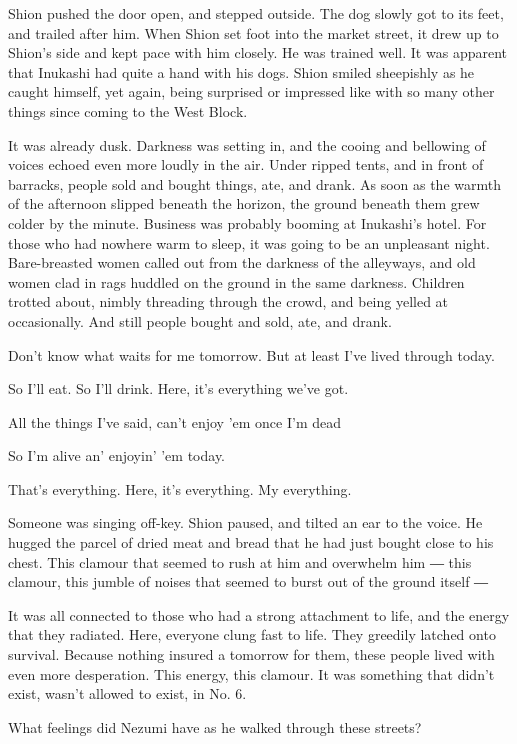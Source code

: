 Shion pushed the door open, and stepped outside. The dog slowly got to
its feet, and trailed after him. When Shion set foot into the market
street, it drew up to Shion's side and kept pace with him closely. He
was trained well. It was apparent that Inukashi had quite a hand with
his dogs. Shion smiled sheepishly as he caught himself, yet again, being
surprised or impressed like with so many other things since coming to
the West Block.

It was already dusk. Darkness was setting in, and the cooing and
bellowing of voices echoed even more loudly in the air. Under ripped
tents, and in front of barracks, people sold and bought things, ate, and
drank. As soon as the warmth of the afternoon slipped beneath the
horizon, the ground beneath them grew colder by the minute. Business was
probably booming at Inukashi's hotel. For those who had nowhere warm to
sleep, it was going to be an unpleasant night. Bare-breasted women
called out from the darkness of the alleyways, and old women clad in
rags huddled on the ground in the same darkness. Children trotted about,
nimbly threading through the crowd, and being yelled at occasionally.
And still people bought and sold, ate, and drank.

Don't know what waits for me tomorrow. But at least I've lived through
today.

So I'll eat. So I'll drink. Here, it's everything we've got.

All the things I've said, can't enjoy 'em once I'm dead

So I'm alive an' enjoyin' 'em today.

That's everything. Here, it's everything. My everything.

Someone was singing off-key. Shion paused, and tilted an ear to the
voice. He hugged the parcel of dried meat and bread that he had just
bought close to his chest. This clamour that seemed to rush at him and
overwhelm him ― this clamour, this jumble of noises that seemed to burst
out of the ground itself ―

It was all connected to those who had a strong attachment to life, and
the energy that they radiated. Here, everyone clung fast to life. They
greedily latched onto survival. Because nothing insured a tomorrow for
them, these people lived with even more desperation. This energy, this
clamour. It was something that didn't exist, wasn't allowed to exist, in
No. 6.

What feelings did Nezumi have as he walked through these streets?

